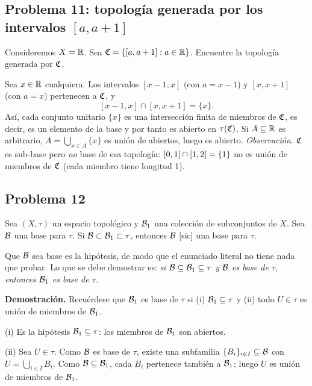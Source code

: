 \subsection{Problema 11: topología generada por los intervalos \texorpdfstring{$[a,a+1]$}{[a,a+1]}}
\begin{enunciado}
Consideremos $X=\mathbb{R}$. Sea $\mathfrak{C}=\{[a,a+1]:a\in\mathbb{R}\}$. Encuentre la topología generada por $\mathfrak{C}$.
\end{enunciado}
Sea $x\in\mathbb{R}$ cualquiera. Los intervalos $[x-1,x]$ (con $a=x-1$) y $[x,x+1]$ (con $a=x$) pertenecen a $\mathfrak{C}$, y
\[ [x-1,x]\cap[x,x+1]=\{x\}. \]
Así, cada conjunto unitario $\{x\}$ es una intersección finita de miembros de $\mathfrak{C}$, es decir, es un elemento de la
base y por tanto es abierto en $\tau(\mathfrak{C})$. Si $A\subseteq\mathbb{R}$ es arbitrario, $A=\bigcup_{x\in A}\{x\}$ es unión de
abiertos, luego es abierto.
\emph{Observación.} $\mathfrak{C}$ es sub-base pero \emph{no} base de esa topología: $[0,1]\cap[1,2]=\{1\}$ no es unión de
miembros de $\mathfrak{C}$ (cada miembro tiene longitud 1).

\subsection{Problema 12}
\begin{enunciado}
Sea $(X,\tau)$ un espacio topológico y $\mathcal{B}_1$ una colección de subconjuntos de $X$. Sea $\mathcal{B}$ una base para $\tau$.
Si $\mathcal{B}\subset\mathcal{B}_1\subset\tau$, entonces $\mathcal{B}$ [sic] una base para $\tau$.
\end{enunciado}
\begin{ojo}[Supuesto S6]
Que $\mathcal{B}$ sea base es la hipótesis, de modo que el enunciado literal no tiene nada que probar. Lo que se debe
demostrar es: \emph{si $\mathcal{B}\subseteq\mathcal{B}_1\subseteq\tau$ y $\mathcal{B}$ es base de $\tau$, entonces $\mathcal{B}_1$ es base de $\tau$.}
\end{ojo}
\textbf{Demostración.} Recuérdese que $\mathcal{B}_1$ es base de $\tau$ si (i) $\mathcal{B}_1\subseteq\tau$ y (ii) todo $U\in\tau$ es
unión de miembros de $\mathcal{B}_1$.

(i) Es la hipótesis $\mathcal{B}_1\subseteq\tau$: los miembros de $\mathcal{B}_1$ son abiertos.

(ii) Sea $U\in\tau$. Como $\mathcal{B}$ es base de $\tau$, existe una subfamilia $\{B_i\}_{i\in I}\subseteq\mathcal{B}$ con
$U=\bigcup_{i\in I}B_i$. Como $\mathcal{B}\subseteq\mathcal{B}_1$, cada $B_i$ pertenece también a $\mathcal{B}_1$; luego $U$ es unión de
miembros de $\mathcal{B}_1$.

